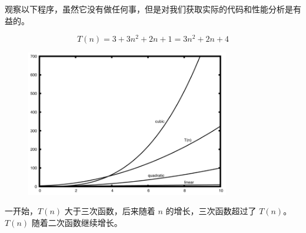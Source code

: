 \begin{frame}\ft{\secname}

 观察以下程序，虽然它没有做任何事，但是对我们获取实际的代码和性能分析是有益的。
 
 \pause

 $$T(n)=3+3n^2 +2n+1=3n^2 + 2n+4$$
\end{frame}


\begin{frame}\ft{\secname}
  
\begin{figure}[htbp]
        \centering
        \includegraphics[width=3.5in]{images/newplot2.png}
\end{figure}
一开始，$T(n)$ 大于三次函数，后来随着 $n$ 的增长，三次函数超过了 $T(n)$。 $T(n)$ 随着二次函数继续增长。
\end{frame}

